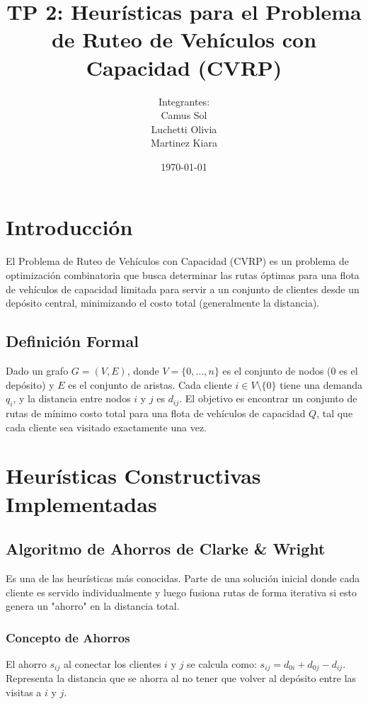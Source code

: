 \documentclass[a4paper,12pt]{article}
\title{TP 2: Heurísticas para el Problema de Ruteo de Vehículos con Capacidad (CVRP)}
\author{
    Integrantes: \\
    Camus Sol \\
    Luchetti Olivia \\
    Martinez Kiara \\
}
\date{\today}
\begin{document}
\maketitle

\tableofcontents
\newpage

\section{Introducción}

El Problema de Ruteo de Vehículos con Capacidad (CVRP) es un problema de optimización combinatoria que busca determinar las rutas óptimas para una flota de vehículos de capacidad limitada para servir a un conjunto de clientes desde un depósito central, minimizando el costo total (generalmente la distancia).

\subsection{Definición Formal}
Dado un grafo $G=(V,E)$, donde $V=\{0, ..., n\}$ es el conjunto de nodos (0 es el depósito) y $E$ es el conjunto de aristas. Cada cliente $i \in V \setminus \{0\}$ tiene una demanda $q_i$, y la distancia entre nodos $i$ y $j$ es $d_{ij}$. El objetivo es encontrar un conjunto de rutas de mínimo costo total para una flota de vehículos de capacidad $Q$, tal que cada cliente sea visitado exactamente una vez.

\section{Heurísticas Constructivas Implementadas}

\subsection{Algoritmo de Ahorros de Clarke \& Wright}
Es una de las heurísticas más conocidas. Parte de una solución inicial donde cada cliente es servido individualmente y luego fusiona rutas de forma iterativa si esto genera un "ahorro" en la distancia total.

\subsubsection{Concepto de Ahorros}
El ahorro $s_{ij}$ al conectar los clientes $i$ y $j$ se calcula como: $s_{ij} = d_{0i} + d_{0j} - d_{ij}$. Representa la distancia que se ahorra al no tener que volver al depósito entre las visitas a $i$ y $j$.
\end{document}
